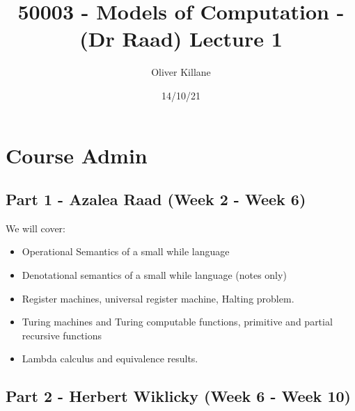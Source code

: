 \documentclass{report}
\title{50003 - Models of Computation - (Dr Raad) Lecture 1}
\author{Oliver Killane}
\date{14/10/21}
\begin{document}
    \maketitle

    \section*{Course Admin}
        \subsection*{Part 1 - Azalea Raad (Week 2 - Week 6)}
            \begin{itemize}
            \end{itemize}
            We will cover:
            \begin{itemize}
                \item Operational Semantics of a small while language
                \item Denotational semantics of a small while language (notes only)
                \item Register machines, universal register machine, Halting problem.
                \item Turing machines and Turing computable functions, primitive and partial recursive functions
                \item Lambda calculus and equivalence results.
            \end{itemize}
        \subsection*{Part 2 - Herbert Wiklicky (Week 6 - Week 10)}
            \begin{itemize}
            \end{itemize}
\end{document}
